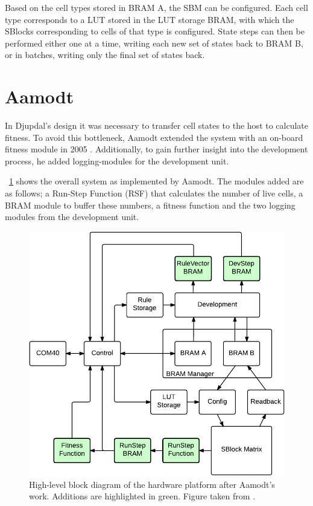Based on the cell types stored in BRAM A, the SBM can be configured. Each cell
type corresponds to a LUT stored in the LUT storage BRAM, with which the SBlocks
corresponding to cells of that type is configured. State steps can then be
performed either one at a time, writing each new set of states back to BRAM B,
or in batches, writing only the final set of states back.

\section{Aamodt}

In Djupdal's design it was necessary to transfer cell states to the host to
calculate fitness. To avoid this bottleneck, Aamodt extended the system with an
on-board fitness module in 2005 \cite{Aamodt2005}. Additionally, to gain further
insight into the development process, he added logging-modules for the
development unit.

\figurename~\ref{fig:overview-aamodt} shows the overall system as implemented by
Aamodt. The modules added are as follows; a Run-Step Function (RSF) that
calculates the number of live cells, a BRAM module to buffer these numbers, a
fitness function and the two logging modules from the development unit.

\begin{figure}[!ht]
    \centering
    \includegraphics[width=0.8\linewidth]{fig/overview-aamodt}
    \caption[Aamodt's hardware design]{
        High-level block diagram of the hardware platform after Aamodt's work.
        Additions are highlighted in green. Figure taken from \cite{Lundal2015a}. 
    }
    \label{fig:overview-aamodt}
\end{figure}


